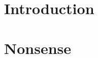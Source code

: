 \documentclass{article}
\begin{document}
\section{Introduction}

\lipsum[1]

\section{Nonsense}

\lipsum[2-4]
\end{document}
